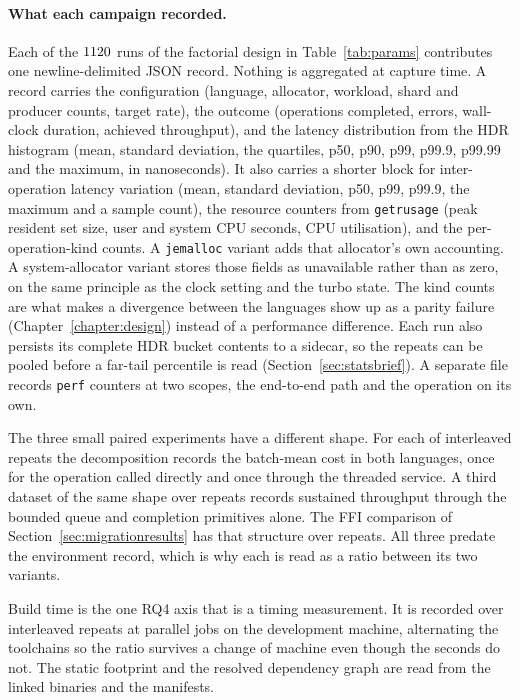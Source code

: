 \documentclass[english,oneside,a4paper,censored,csm,software-track-2020]{HYthesisML}
\begin{document}
\begin{appendices}
\paragraph{What each campaign recorded.}
Each of the $1120$ runs of the factorial design in Table~\ref{tab:params} contributes one
newline-delimited JSON record. Nothing is aggregated at capture time. A record carries the
configuration (language, allocator, workload, shard and producer counts, target rate), the
outcome (operations completed, errors, wall-clock duration, achieved throughput), and the
latency distribution from the HDR histogram (mean, standard deviation, the quartiles, p50, p90,
p99, p99.9, p99.99 and the maximum, in nanoseconds). It also carries a shorter block for
inter-operation latency variation (mean, standard deviation, p50, p99, p99.9, the maximum and a
sample count), the resource counters from \texttt{getrusage} (peak resident set size, user and
system CPU seconds, CPU utilisation), and the per-operation-kind counts. A \texttt{jemalloc}
variant adds that allocator's own accounting. A system-allocator variant stores those fields as
unavailable rather than as zero, on the same principle as the clock setting and the turbo state.
The kind counts are what makes a divergence between the languages show up as a parity failure
(Chapter~\ref{chapter:design}) instead of a performance difference. Each run also persists its
complete HDR bucket contents to a sidecar, so the repeats can be pooled before a far-tail
percentile is read (Section~\ref{sec:statsbrief}). A separate file records \texttt{perf}
counters at two scopes, the end-to-end path and the operation on its own.

The three small paired experiments have a different shape. For each of \BudgetRepeats{}
interleaved repeats the decomposition records the batch-mean cost in both languages, once for
the operation called directly and once through the threaded service. A third dataset of the same
shape over \ContentionRepeats{} repeats records sustained throughput through the bounded queue and
completion primitives alone. The FFI comparison of
Section~\ref{sec:migrationresults} has that structure over \FfiOpRepeats{} repeats. All three
predate the environment record, which is why each is read as a ratio between its two variants.

Build time is the one RQ4 axis that is a timing measurement. It is recorded over
\AdoptRepeats{} interleaved repeats at \AdoptJobs{} parallel jobs on the development machine,
alternating the toolchains so the ratio survives a change of machine even though the seconds do
not. The static footprint and the resolved dependency graph are read from the linked binaries
and the manifests.


\end{appendices}
\end{document}
